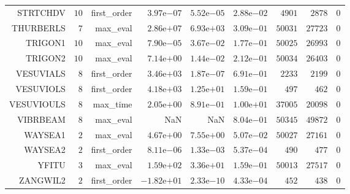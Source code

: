 \begin{longtable}{rrrrrrrrr}
STRTCHDV & \(    10\) & first\_order & \( 3.97\)e\(-07\) & \( 5.52\)e\(-05\) & \( 2.88\)e\(-02\) & \(  4901\) & \(  2878\) & \(     0\) \\
THURBERLS & \(     7\) & max\_eval & \( 2.86\)e\(+07\) & \( 6.93\)e\(+03\) & \( 3.09\)e\(-01\) & \( 50031\) & \( 27723\) & \(     0\) \\
TRIGON1 & \(    10\) & max\_eval & \( 7.90\)e\(-05\) & \( 3.67\)e\(-02\) & \( 1.77\)e\(-01\) & \( 50025\) & \( 26993\) & \(     0\) \\
TRIGON2 & \(    10\) & max\_eval & \( 7.14\)e\(+00\) & \( 1.44\)e\(-02\) & \( 2.12\)e\(-01\) & \( 50034\) & \( 26403\) & \(     0\) \\
VESUVIALS & \(     8\) & first\_order & \( 3.46\)e\(+03\) & \( 1.87\)e\(-07\) & \( 6.91\)e\(-01\) & \(  2233\) & \(  2199\) & \(     0\) \\
VESUVIOLS & \(     8\) & first\_order & \( 4.18\)e\(+03\) & \( 1.25\)e\(+01\) & \( 1.59\)e\(-01\) & \(   497\) & \(   462\) & \(     0\) \\
VESUVIOULS & \(     8\) & max\_time & \( 2.05\)e\(+00\) & \( 8.91\)e\(-01\) & \( 1.00\)e\(+01\) & \( 37005\) & \( 20098\) & \(     0\) \\
VIBRBEAM & \(     8\) & max\_eval &       NaN &       NaN & \( 8.04\)e\(-01\) & \( 50345\) & \( 49872\) & \(     0\) \\
WAYSEA1 & \(     2\) & max\_eval & \( 4.67\)e\(+00\) & \( 7.55\)e\(+00\) & \( 5.07\)e\(-02\) & \( 50027\) & \( 27161\) & \(     0\) \\
WAYSEA2 & \(     2\) & first\_order & \( 8.11\)e\(-06\) & \( 1.33\)e\(-03\) & \( 5.37\)e\(-04\) & \(   490\) & \(   477\) & \(     0\) \\
YFITU & \(     3\) & max\_eval & \( 1.59\)e\(+02\) & \( 3.36\)e\(+01\) & \( 1.59\)e\(-01\) & \( 50013\) & \( 27517\) & \(     0\) \\
ZANGWIL2 & \(     2\) & first\_order & \(-1.82\)e\(+01\) & \( 2.33\)e\(-10\) & \( 4.33\)e\(-04\) & \(   452\) & \(   438\) & \(     0\) \\\hline
\end{longtable}
